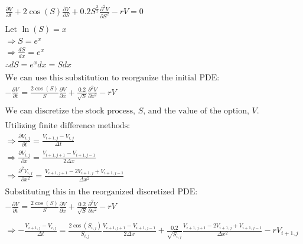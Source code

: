\documentclass[10pt]{article}
\begin{document}
\begin{gather*}
    \frac{\partial V}{\partial t} + 2\cos{(S)} \frac{\partial V}{\partial S} + 0.2 S^\frac{3}{2} \frac{\partial^2 V}{\partial S^2} - rV = 0 \\
    \\
    \text{Let } \ln{(S) = x} \\
    \Rightarrow S = e^x \\
    \Rightarrow \frac{dS}{dx} = e^x \\
    \therefore dS = e^x dx = S dx \\
    \\
    \text{We can use this substitution to reorganize the initial PDE:} \\
    - \frac{\partial V}{\partial t} = \frac{2\cos{(S)}}{S} \frac{\partial V}{\partial x} + \frac{0.2}{\sqrt{S}} \frac{\partial^2 V}{\partial x^2} - rV \\
    \\
    \text{We can discretize the stock process, $S$, and the value of the option, $V$.} \\
    \\
    \text{Utilizing finite difference methods:} \\
    \Rightarrow \frac{\partial V_{i, j}}{\partial t} = \frac{V_{i+1, j} - V_{i, j}}{\Delta t} \\
    \Rightarrow \frac{\partial V_{i, j}}{\partial x} = \frac{V_{i+1,j+1} - V_{i+1, j-1}}{2 \Delta x} \\
    \Rightarrow \frac{\partial^2 V_{i, j}}{\partial x^2} = \frac{V_{i+1, j+1} - 2V_{i+1, j} + V_{i+1, j-1}}{\Delta x^2} \\
    \\
    \text{Substituting this in the reorganized discretized PDE:} \\
    - \frac{\partial V}{\partial t} = \frac{2\cos{(S)}}{S} \frac{\partial V}{\partial x} + \frac{0.2}{\sqrt{S}} \frac{\partial^2 V}{\partial x^2} - rV \\
    \\
    \Rightarrow - \frac{V_{i+1, j} - V_{i, j}}{\Delta t} = \frac{2\cos{(S_{i, j})}}{S_{i,j}} \frac{V_{i+1,j+1} - V_{i+1, j-1}}{2 \Delta x} + \frac{0.2}{\sqrt{S_{i, j}}} \frac{V_{i+1, j+1} - 2V_{i+1, j} + V_{i+1, j-1}}{\Delta x^2} - rV_{i+1, j}
\end{gather*}
\end{document}
